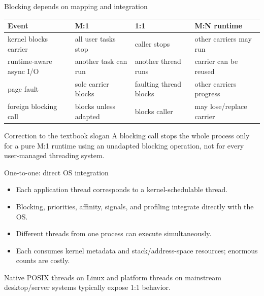 \documentclass[aspectratio=169,11pt]{beamer}
\begin{document}
\begin{frame}{Blocking depends on mapping and integration}
  \small
  \begin{tabularx}{\textwidth}{@{}lXXX@{}}
    \toprule
    \textbf{Event} & \textbf{M:1} & \textbf{1:1} & \textbf{M:N runtime} \\
    \midrule
    kernel blocks carrier & all user tasks stop & caller stops & other carriers may run \\
    runtime-aware async I/O & another task can run & another thread runs & carrier can be reused \\
    page fault & sole carrier blocks & faulting thread blocks & other carriers progress \\
    foreign blocking call & blocks unless adapted & blocks caller & may lose/replace carrier \\
    \bottomrule
  \end{tabularx}
  \begin{alertblock}{Correction to the textbook slogan}
    A blocking call stops the whole process only for a pure M:1 runtime using an unadapted blocking operation, not for every user-managed threading system.
  \end{alertblock}
\end{frame}

\begin{frame}{One-to-one: direct OS integration}
  \begin{itemize}
    \item Each application thread corresponds to a kernel-schedulable thread.
    \item Blocking, priorities, affinity, signals, and profiling integrate directly with the OS.
    \item Different threads from one process can execute simultaneously.
    \item Each consumes kernel metadata and stack/address-space resources; enormous counts are costly.
  \end{itemize}
  \begin{tcolorbox}[title=Common deployment,colback=osgreen!5,colframe=osgreen!70]
    Native POSIX threads on Linux and platform threads on mainstream desktop/server systems typically expose 1:1 behavior.
  \end{tcolorbox}
\end{frame}
\end{document}

